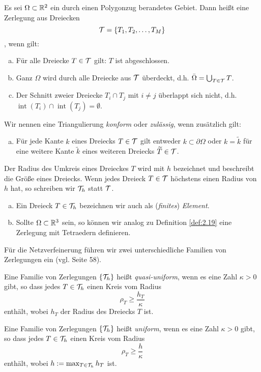 \begin{defi}\label{def:2.19}
Es sei $\Omega \subset \mathbb{R}^2$ ein durch einen Polygonzug berandetes Gebiet. Dann heißt eine Zerlegung aus Dreiecken
\[
	\mathcal T = \{T_1,T_2,\ldots,T_M\}
\]
\textit{}, wenn gilt:
\begin{enumerate}[(a)]
\item Für alle Dreiecke $T \in \mathcal T$ gilt: $T$ ist abgeschlossen.
\item	Ganz $\Omega$ wird durch alle Dreiecke aus $\mathcal T$ überdeckt, d.h. $\bar\Omega = \bigcup_{T\in \mathcal T} T$.
\item Der Schnitt zweier Dreiecke $T_i\cap T_j$ mit $i \not = j$ überlappt sich nicht, d.h. $\operatorname{int}(T_i)\cap \operatorname{int}(T_j) = \emptyset$.
\end{enumerate}
Wir nennen eine Triangulierung \textit{konform} oder \textit{zulässig}, wenn zusätzlich gilt:
\begin{enumerate}[(d)]
\item Für jede Kante $k$ eines Dreiecks $T \in \mathcal T$ gilt entweder $k \subset \partial \Omega$ oder $k = \tilde k$ für eine weitere Kante $\tilde k$ eines weiteren Dreiecks $\widetilde T \in \mathcal T$. 
\end{enumerate}
Der Radius des Umkreis eines Dreieckes $T$ wird mit $h$ bezeichnet und beschreibt die Größe eines Dreiecks. Wenn jedes Dreieck $T \in \mathcal T$ höchstens einen Radius von $h$ hat, so schreiben wir $\mathcal T_h$ statt $\mathcal T$.
\end{defi}


\begin{bem}\label{bem:2.20}
\begin{enumerate}[(a)]
\item Ein Dreieck $T\in \mathcal T_h$ bezeichnen wir auch als (\textit{finites}) \textit{Element}.
\item Sollte $\Omega \subset \mathbb{R}^3$ sein, so können wir  analog zu Definition \ref{def:2.19} eine Zerlegung mit Tetraedern definieren.
\end{enumerate}
\end{bem}


Für die Netzverfeinerung führen wir zwei unterschiedliche Familien von Zerlegungen ein (vgl. \cite{BraeFEM} Seite 58).


\begin{defi}\label{def:2.21}
Eine Familie von Zerlegungen $\{\mathcal T_h\}$ heißt \textit{quasi-uniform}, wenn es eine Zahl $\kappa > 0$ gibt, so dass jedes $T \in \mathcal T_h$ einen Kreis vom Radius
\[
	\rho_T \ge \frac{h_T}\kappa
\]
enthält, wobei $h_T$ der Radius des Dreiecks $T$ ist.

Eine Familie von Zerlegungen $\{\mathcal T_h\}$ heißt \textit{uniform}, wenn es eine Zahl $\kappa > 0$ gibt, so dass jedes $T \in \mathcal T_h$ einen Kreis vom Radius
\[
	\rho_T \ge \frac{h}\kappa
\]
enthält, wobei $h := \max_{T \in \mathcal T_h} h_T$ ist.
\end{defi}



